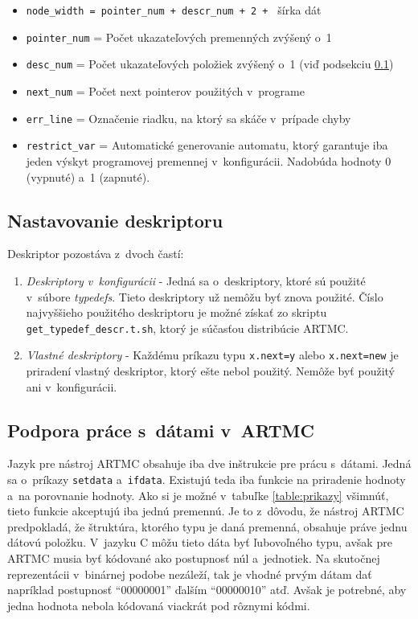 \begin{itemize}
\item \texttt{node\_width = pointer\_num + descr\_num + 2 + } šírka dát  
\item \texttt{pointer\_num} = Počet ukazateľových premenných zvýšený o~1
\item \texttt{desc\_num} = Počet ukazateľových položiek zvýšený o~1 (viď podsekciu \ref{kap_descr})
\item \texttt{next\_num} = Počet next pointerov použitých v~programe
\item \texttt{err\_line} = Označenie riadku, na ktorý sa skáče v~prípade chyby
\item \texttt{restrict\_var} = Automatické generovanie automatu, ktorý garantuje iba jeden výskyt programovej premennej v~konfigurácii. Nadobúda hodnoty 0 (vypnuté) a~1 (zapnuté).
\end{itemize}


\subsection{Nastavovanie deskriptoru}
\label{kap_descr}
Deskriptor pozostáva z~dvoch častí:
\begin{enumerate}
\item \textit{Deskriptory v~konfigurácii} - Jedná sa o~deskriptory, ktoré sú použité v~súbore \textit{typedefs}. Tieto deskriptory už nemôžu byť znova použité. Číslo najvyššieho použitého deskriptoru je možné získať zo skriptu \texttt{get\_typedef\_descr.t.sh}, ktorý je súčasťou distribúcie ARTMC.
\item \textit{Vlastné deskriptory} - Každému príkazu typu \texttt{x.next=y} alebo \texttt{x.next=new} je priradení vlastný deskriptor, ktorý ešte nebol použitý. Nemôže byť použitý ani v~konfigurácii.
\end{enumerate}

\subsection{Podpora práce s~dátami v~ARTMC}
Jazyk pre nástroj ARTMC obsahuje iba dve inštrukcie pre prácu s~dátami. Jedná sa o~príkazy \texttt{setdata} a~\texttt{ifdata}. Existujú teda iba funkcie na priradenie hodnoty a~na porovnanie hodnoty. Ako si je možné v~tabuľke \ref{table:prikazy} všimnúť, tieto funkcie akceptujú iba jednú premennú. Je to z~dôvodu, že nástroj ARTMC predpokladá, že štruktúra, ktorého typu je daná premenná, obsahuje práve jednu dátovú položku. V~jazyku C môžu tieto dáta byť ľubovoľného typu, avšak pre ARTMC musia byť kódované ako postupnosť núl a~jednotiek. Na skutočnej reprezentácii v~binárnej podobe nezáleží, tak je vhodné prvým dátam dať napríklad postupnosť ``00000001'' ďalším ``00000010'' atď. Avšak je potrebné, aby jedna hodnota nebola kódovaná viackrát pod rôznymi kódmi.

